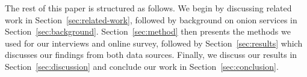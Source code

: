 The rest of this paper is structured as follows.  We begin by discussing related
work in Section~\ref{sec:related-work}, followed by background on onion services
in Section~\ref{sec:background}.  Section~\ref{sec:method} then presents the
methods we used for our interviews and online survey, followed by
Section~\ref{sec:results} which discusses our findings from both data sources.
Finally, we discuss our results in Section~\ref{sec:discussion} and conclude our
work in Section~\ref{sec:conclusion}.

